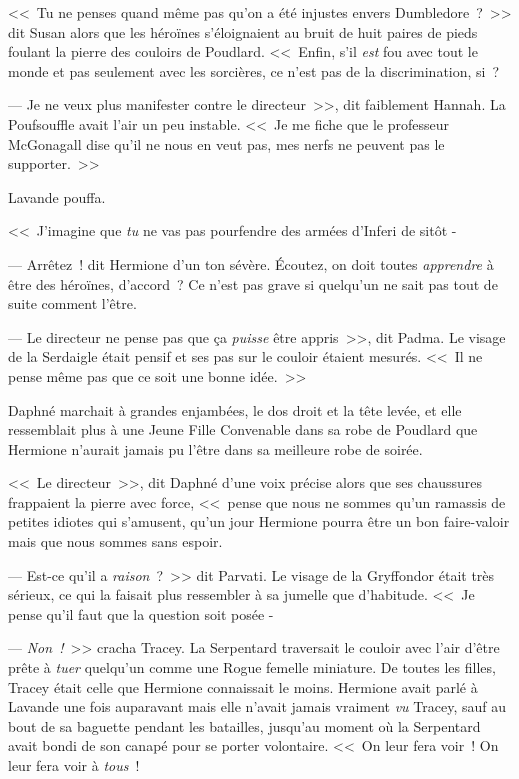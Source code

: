 <<~Tu ne penses quand même pas qu'on a été injustes envers Dumbledore~?~>> dit Susan alors que les héroïnes s'éloignaient au bruit de huit paires de pieds foulant la pierre des couloirs de Poudlard. <<~Enfin, s'il \emph{est} fou avec tout le monde et pas seulement avec les sorcières, ce n'est pas de la discrimination, si~?

--- Je ne veux plus manifester contre le directeur~>>, dit faiblement Hannah. La Poufsouffle avait l'air un peu instable. <<~Je me fiche que le professeur McGonagall dise qu'il ne nous en veut pas, mes nerfs ne peuvent pas le supporter.~>>

Lavande pouffa.

<<~J'imagine que \emph{tu} ne vas pas pourfendre des armées d'Inferi de sitôt -

--- Arrêtez~! dit Hermione d'un ton sévère. Écoutez, on doit toutes \emph{apprendre} à être des héroïnes, d'accord~? Ce n'est pas grave si quelqu'un ne sait pas tout de suite comment l'être.

--- Le directeur ne pense pas que ça \emph{puisse} être appris~>>, dit Padma. Le visage de la Serdaigle était pensif et ses pas sur le couloir étaient mesurés. <<~Il ne pense même pas que ce soit une bonne idée.~>>

Daphné marchait à grandes enjambées, le dos droit et la tête levée, et elle ressemblait plus à une Jeune Fille Convenable dans sa robe de Poudlard que Hermione n'aurait jamais pu l'être dans sa meilleure robe de soirée.

<<~Le directeur~>>, dit Daphné d'une voix précise alors que ses chaussures frappaient la pierre avec force, <<~pense que nous ne sommes qu'un ramassis de petites idiotes qui s'amusent, qu'un jour Hermione pourra être un bon faire-valoir mais que nous sommes sans espoir.

--- Est-ce qu'il a \emph{raison}~?~>> dit Parvati. Le visage de la Gryffondor était très sérieux, ce qui la faisait plus ressembler à sa jumelle que d'habitude. <<~Je pense qu'il faut que la question soit posée -

--- \emph{Non~!}~>> cracha Tracey. La Serpentard traversait le couloir avec l'air d'être prête à \emph{tuer} quelqu'un comme une Rogue femelle miniature. De toutes les filles, Tracey était celle que Hermione connaissait le moins. Hermione avait parlé à Lavande une fois auparavant mais elle n'avait jamais vraiment \emph{vu} Tracey, sauf au bout de sa baguette pendant les batailles, jusqu'au moment où la Serpentard avait bondi de son canapé pour se porter volontaire. <<~On leur fera voir~! On leur fera voir à \emph{tous}~!

